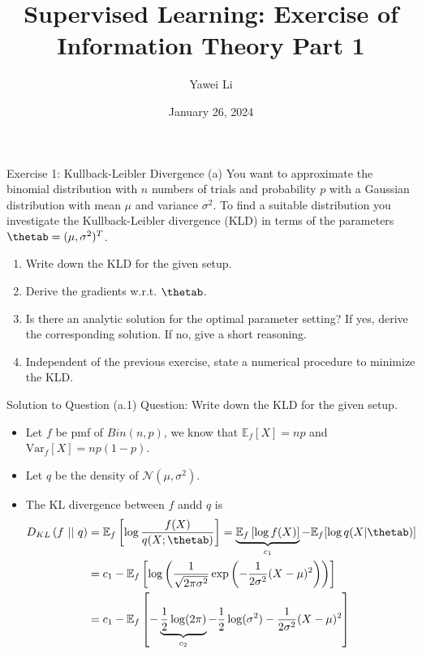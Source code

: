 \documentclass[aspectratio=169]{beamer}
\title[]{\textbf{Supervised Learning: Exercise of \\ Information Theory Part 1}}
\author{Yawei Li}
\institute[LMU]
{
\\
  \texttt{yawei.li@stat.uni-muenchen.de}
}
\date{January 26, 2024}
\newcommand{\kld}[1]{D_{KL}\left(#1\right)}
\newcommand{\Ef}{\mathbb{E}_f}
\newcommand{\Varf}{\mathrm{Var}_f}
\begin{document}
\begin{frame}
\titlepage

\end{frame}


\begin{frame}{Exercise 1: Kullback-Leibler Divergence}
	(a) You want to approximate the binomial distribution with $n$ numbers of trials and probability $p$ with a Gaussian distribution with mean $\mu$ and variance $\sigma^2$. To find a suitable distribution you investigate the Kullback-Leibler divergence (KLD) in terms of the parameters $\thetab = (\mu, \sigma^2)^T$.
	\begin{enumerate}
		\item Write down the KLD for the given setup.
		\item Derive the gradients w.r.t. $\thetab$.
		\item Is there an analytic solution for the optimal parameter setting? If yes, derive the corresponding solution. If no, give a short reasoning.
		\item Independent of the previous exercise, state a numerical procedure to minimize the KLD.
	\end{enumerate}
\end{frame}

\begin{frame}{Solution to Question (a.1)}
	\small
	Question: Write down the KLD for the given setup.
	
	\begin{itemize}
		\item Let $f$ be pmf of $Bin(n, p)$, we know that $\Ef[X] = np$ and $\Varf[X] = np (1 - p)$.
		\item<2-> Let $q$ be the density of $\mathcal{N}(\mu, \sigma^2)$.
		\item<3-> The KL divergence between $f$ andd $q$ is
		\begin{align*}
			\kld{f \ || \ q} 
			&= \Ef \left[ \log \frac{f(X)}{q(X; \thetab)} \right] = \underbrace{\Ef \left[ \log f(X) \right]}_{c_1} - \Ef [\log q(X|\thetab)] \\
			&= c_1 - \Ef \left[ \log \left( \frac{1}{\sqrt{2 \pi \sigma^2}} \exp \left( - \frac{1}{2\sigma^2} (X - \mu)^2 \right)  \right) \right] \\
			&= c_1 - \Ef \left[ - \underbrace{\frac{1}{2} \log(2\pi)}_{c_2} - \frac{1}{2} \log (\sigma^2) - \frac{1}{2\sigma^2} (X - \mu)^2 \right]
		\end{align*}
	\end{itemize}
	
\end{frame}
\end{document}
